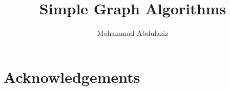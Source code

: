 \documentclass[11pt,a4paper]{article}
\begin{document}
\title{Simple Graph Algorithms}
\author{Mohammad Abdulaziz}
\maketitle

\begin{abstract}
\end{abstract}


\section{Acknowledgements}





\end{document}
